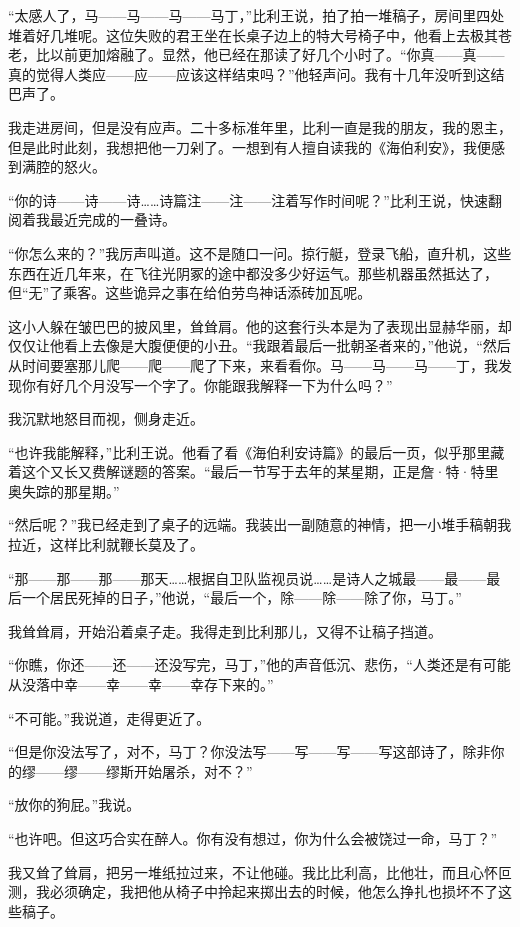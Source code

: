\documentclass[AutoFakeBold=true]{book}
\begin{document}
``太感人了，马——马——马——马丁，''比利王说，拍了拍一堆稿子，房间里四处堆着好几堆呢。这位失败的君王坐在长桌子边上的特大号椅子中，他看上去极其苍老，比以前更加熔融了。显然，他已经在那读了好几个小时了。``你真——真——真的觉得人类应——应——应该这样结束吗？''他轻声问。我有十几年没听到这结巴声了。

我走进房间，但是没有应声。二十多标准年里，比利一直是我的朋友，我的恩主，但是此时此刻，我想把他一刀剁了。一想到有人擅自读我的《海伯利安》，我便感到满腔的怒火。

``你的诗——诗——诗……诗篇注——注——注着写作时间呢？''比利王说，快速翻阅着我最近完成的一叠诗。

``你怎么来的？''我厉声叫道。这不是随口一问。掠行艇，登录飞船，直升机，这些东西在近几年来，在飞往光阴冢的途中都没多少好运气。那些机器虽然抵达了，但``无''了乘客。这些诡异之事在给伯劳鸟神话添砖加瓦呢。

这小人躲在皱巴巴的披风里，耸耸肩。他的这套行头本是为了表现出显赫华丽，却仅仅让他看上去像是大腹便便的小丑。``我跟着最后一批朝圣者来的，''他说，``然后从时间要塞那儿爬——爬——爬了下来，来看看你。马——马——马——丁，我发现你有好几个月没写一个字了。你能跟我解释一下为什么吗？''

我沉默地怒目而视，侧身走近。

``也许我能解释，''比利王说。他看了看《海伯利安诗篇》的最后一页，似乎那里藏着这个又长又费解谜题的答案。``最后一节写于去年的某星期，正是詹·特·特里奥失踪的那星期。''

``然后呢？''我已经走到了桌子的远端。我装出一副随意的神情，把一小堆手稿朝我拉近，这样比利就鞭长莫及了。

``那——那——那——那天……根据自卫队监视员说……是诗人之城最——最——最后一个居民死掉的日子，''他说，``最后一个，除——除——除了你，马丁。''

我耸耸肩，开始沿着桌子走。我得走到比利那儿，又得不让稿子挡道。

``你瞧，你还——还——还没写完，马丁，''他的声音低沉、悲伤，``人类还是有可能从没落中幸——幸——幸——幸存下来的。''

``不可能。''我说道，走得更近了。

``但是你没法写了，对不，马丁？你没法写——写——写——写这部诗了，除非你的缪——缪——缪斯开始屠杀，对不？''

``放你的狗屁。''我说。

``也许吧。但这巧合实在醉人。你有没有想过，你为什么会被饶过一命，马丁？''

我又耸了耸肩，把另一堆纸拉过来，不让他碰。我比比利高，比他壮，而且心怀叵测，我必须确定，我把他从椅子中拎起来掷出去的时候，他怎么挣扎也损坏不了这些稿子。
\end{document}
